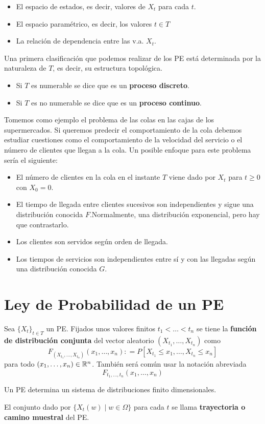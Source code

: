 \documentclass[PREyA.tex]{subfiles}
\begin{document}
\begin{itemize}
\item El espacio de estados, es decir, valores de $X_t$ para cada $t$.
\item El espacio paramétrico, es decir, los valores $t\in T$
\item La relación de dependencia entre las v.a. $X_t$.
\end{itemize}
\begin{defi}
Una primera clasificación que podemos realizar de los PE está determinada por la naturaleza de $T$, es decir, su estructura topológica.
\begin{itemize}
\item Si $T$ es numerable se dice que es un \textbf{proceso discreto}.
\item Si $T$ es no numerable se dice que es un \textbf{proceso continuo}.
\end{itemize}
\end{defi}
\begin{example}
Tomemos como ejemplo el problema de las colas en las cajas de los supermercados. Si queremos predecir el comportamiento de la cola debemos estudiar cuestiones como el comportamiento de la velocidad del servicio o el número de clientes que llegan a la cola.
Un posible enfoque para este problema sería el siguiente:
\begin{itemize}
\item El número de clientes en la cola en el instante $T$ viene dado por $X_t$ para $t\geq 0$ con $X_0 = 0$.
\item El tiempo de llegada entre clientes sucesivos son independientes y sigue una distribución conocida $F$.Normalmente, una distribución exponencial, pero hay que contrastarlo.
\item Los clientes son servidos según orden de llegada.
\item Los tiempos de servicios son independientes entre sí y con las llegadas según una distribución conocida $G$. 
\end{itemize}
\end{example}
\section{Ley de Probabilidad de un PE}
\begin{defi} Sea $\{X_t\}_{t\in T}$ un PE. Fijados unos valores finitos $t_1<\dotsc<t_n$ se tiene la \textbf{función de distribución conjunta} del vector aleatorio $(X_{t_1},\dotsc,X_{t_n})$ como
$$
F_{(X_{t_1},\dotsc,X_{t_n}) }(x_1,\dotsc,x_n): = P[X_{t_1}\leq x_1,\dotsc,X_{t_n}\leq x_n]
$$
para todo $(x_1,\dotsc,x_n) \in \mathbb{R}^n$. También será común usar la notación abreviada
$$
F_{t_1,\dotsc,t_n}(x_1,\dotsc,x_n)
$$
\end{defi}
\begin{nota}
Un PE determina un sistema de distribuciones finito dimensionales.
\end{nota}
\begin{defi}
El conjunto dado por $\{X_t(w)\mid w \in \Omega\}$ para cada $t$ se llama \textbf{trayectoria o camino muestral} del PE.
\end{defi}
\end{document}

